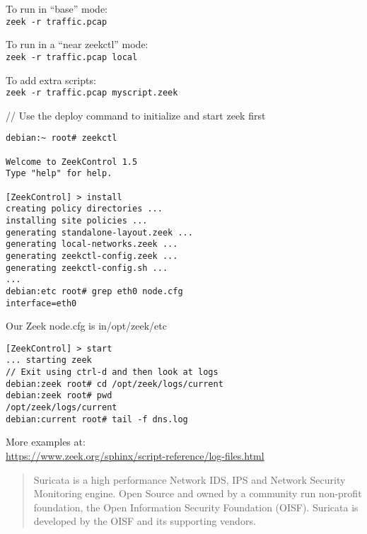 \documentclass[Screen16to9,17pt]{foils}
\begin{document}


\begin{list2}
\item To run in “base” mode:\\
 \verb+zeek -r traffic.pcap+
\item To run in a “near zeekctl” mode:\\
\verb+zeek -r traffic.pcap local+
\item To add extra scripts:\\
\verb+zeek -r traffic.pcap myscript.zeek+
\end{list2}



// Use the deploy command to initialize and start zeek first
\begin{verbatim}
debian:~ root# zeekctl

Welcome to ZeekControl 1.5
Type "help" for help.

[ZeekControl] > install
creating policy directories ...
installing site policies ...
generating standalone-layout.zeek ...
generating local-networks.zeek ...
generating zeekctl-config.zeek ...
generating zeekctl-config.sh ...
...
debian:etc root# grep eth0 node.cfg
interface=eth0
\end{verbatim}

\centerline{Our Zeek node.cfg is in/opt/zeek/etc}


\begin{verbatim}
[ZeekControl] > start
... starting zeek
// Exit using ctrl-d and then look at logs
debian:zeek root# cd /opt/zeek/logs/current
debian:zeek root# pwd
/opt/zeek/logs/current
debian:current root# tail -f dns.log
\end{verbatim}

More examples at:\\
\url{https://www.zeek.org/sphinx/script-reference/log-files.html}




\begin{quote}
Suricata is a high performance Network IDS, IPS and Network Security Monitoring engine. Open Source and owned by a community run non-profit foundation, the Open Information Security Foundation (OISF). Suricata is developed by the OISF and its supporting vendors.
\end{quote}
\end{document}
